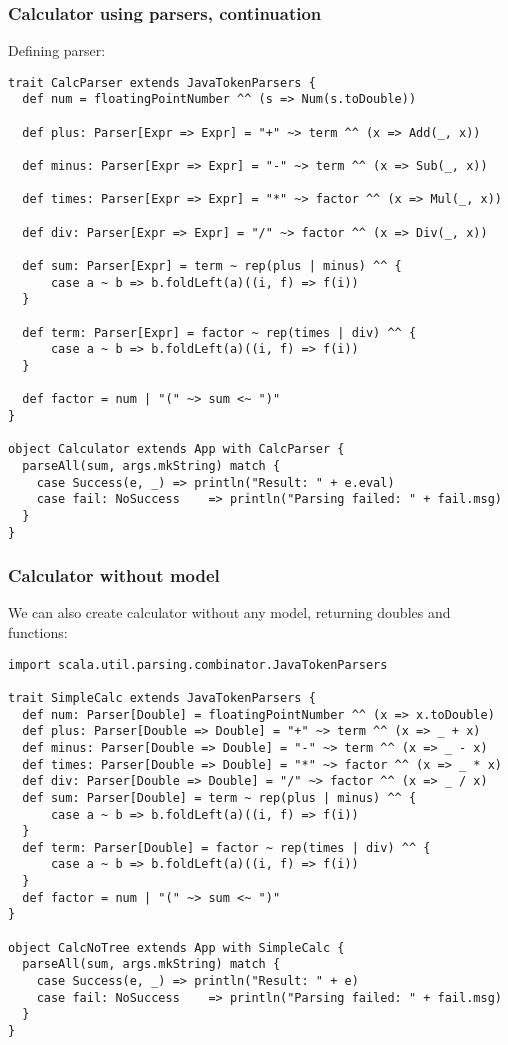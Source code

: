 \documentclass{beamer}
\begin{document}
\begin{frame}[fragile]
\frametitle{Calculator using parsers, continuation}
Defining parser:
\begin{lstlisting}[name=calc]
trait CalcParser extends JavaTokenParsers {
  def num = floatingPointNumber ^^ (s => Num(s.toDouble))

  def plus: Parser[Expr => Expr] = "+" ~> term ^^ (x => Add(_, x))

  def minus: Parser[Expr => Expr] = "-" ~> term ^^ (x => Sub(_, x))

  def times: Parser[Expr => Expr] = "*" ~> factor ^^ (x => Mul(_, x))

  def div: Parser[Expr => Expr] = "/" ~> factor ^^ (x => Div(_, x))

  def sum: Parser[Expr] = term ~ rep(plus | minus) ^^ {
      case a ~ b => b.foldLeft(a)((i, f) => f(i))
  }

  def term: Parser[Expr] = factor ~ rep(times | div) ^^ {
      case a ~ b => b.foldLeft(a)((i, f) => f(i))
  }

  def factor = num | "(" ~> sum <~ ")"
}

object Calculator extends App with CalcParser {
  parseAll(sum, args.mkString) match {
    case Success(e, _) => println("Result: " + e.eval)
    case fail: NoSuccess    => println("Parsing failed: " + fail.msg)
  }
}
\end{lstlisting}
\end{frame}

\begin{frame}[fragile]
\frametitle{Calculator without model}

We can also create calculator without any model, returning doubles and functions:

\begin{lstlisting}
import scala.util.parsing.combinator.JavaTokenParsers

trait SimpleCalc extends JavaTokenParsers {
  def num: Parser[Double] = floatingPointNumber ^^ (x => x.toDouble)
  def plus: Parser[Double => Double] = "+" ~> term ^^ (x => _ + x)
  def minus: Parser[Double => Double] = "-" ~> term ^^ (x => _ - x)
  def times: Parser[Double => Double] = "*" ~> factor ^^ (x => _ * x)
  def div: Parser[Double => Double] = "/" ~> factor ^^ (x => _ / x)
  def sum: Parser[Double] = term ~ rep(plus | minus) ^^ {
      case a ~ b => b.foldLeft(a)((i, f) => f(i))
  }
  def term: Parser[Double] = factor ~ rep(times | div) ^^ {
      case a ~ b => b.foldLeft(a)((i, f) => f(i))
  }
  def factor = num | "(" ~> sum <~ ")"
}

object CalcNoTree extends App with SimpleCalc {
  parseAll(sum, args.mkString) match {
    case Success(e, _) => println("Result: " + e)
    case fail: NoSuccess    => println("Parsing failed: " + fail.msg)
  }
}
\end{lstlisting}
\end{frame}
\end{document}
